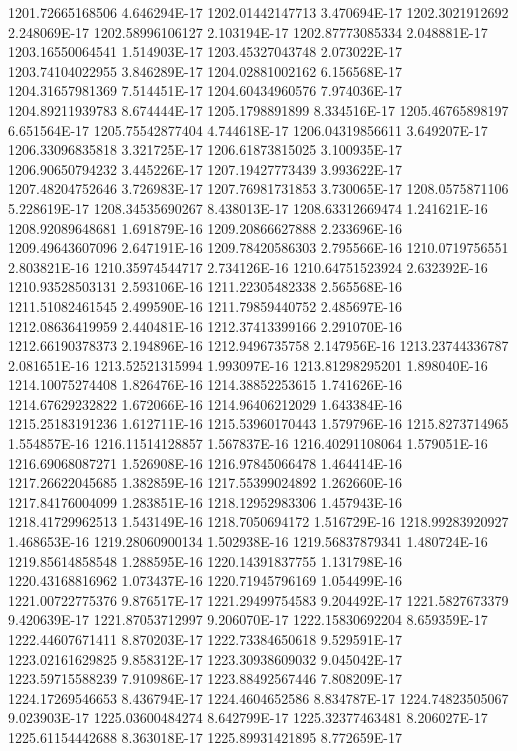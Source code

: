 1201.72665168506  4.646294E-17
1202.01442147713  3.470694E-17
1202.3021912692  2.248069E-17
1202.58996106127  2.103194E-17
1202.87773085334  2.048881E-17
1203.16550064541  1.514903E-17
1203.45327043748  2.073022E-17
1203.74104022955  3.846289E-17
1204.02881002162  6.156568E-17
1204.31657981369  7.514451E-17
1204.60434960576  7.974036E-17
1204.89211939783  8.674444E-17
1205.1798891899  8.334516E-17
1205.46765898197  6.651564E-17
1205.75542877404  4.744618E-17
1206.04319856611  3.649207E-17
1206.33096835818  3.321725E-17
1206.61873815025  3.100935E-17
1206.90650794232  3.445226E-17
1207.19427773439  3.993622E-17
1207.48204752646  3.726983E-17
1207.76981731853  3.730065E-17
1208.0575871106  5.228619E-17
1208.34535690267  8.438013E-17
1208.63312669474  1.241621E-16
1208.92089648681  1.691879E-16
1209.20866627888  2.233696E-16
1209.49643607096  2.647191E-16
1209.78420586303  2.795566E-16
1210.0719756551  2.803821E-16
1210.35974544717  2.734126E-16
1210.64751523924  2.632392E-16
1210.93528503131  2.593106E-16
1211.22305482338  2.565568E-16
1211.51082461545  2.499590E-16
1211.79859440752  2.485697E-16
1212.08636419959  2.440481E-16
1212.37413399166  2.291070E-16
1212.66190378373  2.194896E-16
1212.9496735758  2.147956E-16
1213.23744336787  2.081651E-16
1213.52521315994  1.993097E-16
1213.81298295201  1.898040E-16
1214.10075274408  1.826476E-16
1214.38852253615  1.741626E-16
1214.67629232822  1.672066E-16
1214.96406212029  1.643384E-16
1215.25183191236  1.612711E-16
1215.53960170443  1.579796E-16
1215.8273714965  1.554857E-16
1216.11514128857  1.567837E-16
1216.40291108064  1.579051E-16
1216.69068087271  1.526908E-16
1216.97845066478  1.464414E-16
1217.26622045685  1.382859E-16
1217.55399024892  1.262660E-16
1217.84176004099  1.283851E-16
1218.12952983306  1.457943E-16
1218.41729962513  1.543149E-16
1218.7050694172  1.516729E-16
1218.99283920927  1.468653E-16
1219.28060900134  1.502938E-16
1219.56837879341  1.480724E-16
1219.85614858548  1.288595E-16
1220.14391837755  1.131798E-16
1220.43168816962  1.073437E-16
1220.71945796169  1.054499E-16
1221.00722775376  9.876517E-17
1221.29499754583  9.204492E-17
1221.5827673379  9.420639E-17
1221.87053712997  9.206070E-17
1222.15830692204  8.659359E-17
1222.44607671411  8.870203E-17
1222.73384650618  9.529591E-17
1223.02161629825  9.858312E-17
1223.30938609032  9.045042E-17
1223.59715588239  7.910986E-17
1223.88492567446  7.808209E-17
1224.17269546653  8.436794E-17
1224.4604652586  8.834787E-17
1224.74823505067  9.023903E-17
1225.03600484274  8.642799E-17
1225.32377463481  8.206027E-17
1225.61154442688  8.363018E-17
1225.89931421895  8.772659E-17
